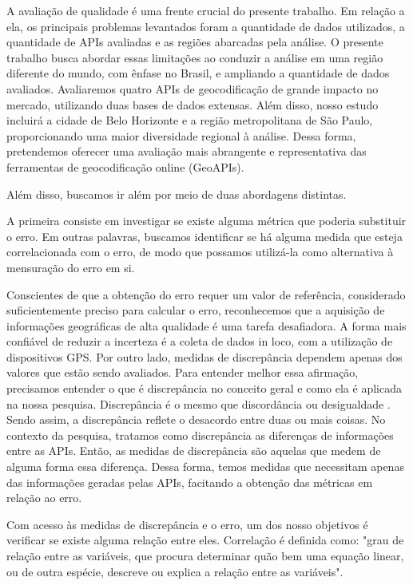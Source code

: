 A avaliação de qualidade é uma frente crucial do presente trabalho. Em relação a ela, os principais problemas levantados foram a quantidade de dados utilizados, a quantidade de APIs avaliadas e as regiões abarcadas pela análise. O presente trabalho busca abordar essas limitações ao conduzir a análise em uma região diferente do mundo, com ênfase no Brasil, e ampliando a quantidade de dados avaliados. Avaliaremos quatro APIs de geocodificação de grande impacto no mercado, utilizando duas bases de dados extensas. Além disso, nosso estudo incluirá a cidade de Belo Horizonte e a região metropolitana de São Paulo, proporcionando uma maior diversidade regional à análise. Dessa forma, pretendemos oferecer uma avaliação mais abrangente e representativa das ferramentas de geocodificação online (GeoAPIs).

Além disso, buscamos ir além por meio de duas abordagens distintas.

A primeira consiste em investigar se existe alguma métrica que poderia substituir o erro. Em outras palavras, buscamos identificar se há alguma medida que esteja correlacionada com o erro, de modo que possamos utilizá-la como alternativa à mensuração do erro em si.

Conscientes de que a obtenção do erro requer um valor de referência, considerado suficientemente preciso para calcular o erro, reconhecemos que a aquisição de informações geográficas de alta qualidade é uma tarefa desafiadora. A forma mais confiável de reduzir a incerteza é a coleta de dados in loco, com a utilização de dispositivos GPS.
Por outro lado, medidas de discrepância dependem apenas dos valores que estão sendo avaliados. Para entender melhor essa afirmação, precisamos entender o que é discrepância no conceito geral e como ela é aplicada na nossa pesquisa. Discrepância é o mesmo que discordância ou desigualdade \cite{klein2015}. Sendo assim, a discrepância reflete o desacordo entre duas ou mais coisas. No contexto da pesquisa, tratamos como discrepância as diferenças de informações entre as APIs. Então, as medidas de discrepância são aquelas que medem de alguma forma essa diferença. Dessa forma, temos medidas que necessitam apenas das informações geradas pelas APIs, facitando a obtenção das métricas em relação ao erro.

Com acesso às medidas de discrepância e o erro, um dos nosso objetivos é verificar se existe alguma relação entre eles. Correlação é definida como: "grau de relação entre as variáveis, que procura determinar quão bem uma equação linear, ou de outra espécie, descreve ou explica a relação entre as variáveis"\cite{spiegel2009}.

